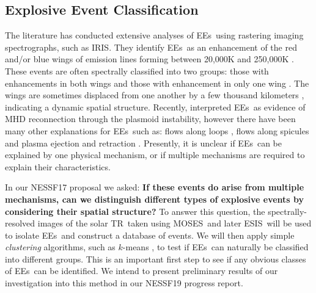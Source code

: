 \documentclass[10pt,letterpaper, doublespace]{article}
\newcommand{\TR}{\ac{TR}}
\newcommand{\EEs}{\acp{EE}}
\newcommand{\MOSES}{\ac{MOSES}}
\newcommand{\ESIS}{\ac{ESIS}}
\newcommand{\IRIS}{\ac{IRIS}}
\begin{document}
		
		\subsection{Explosive Event Classification}
		
			The literature has conducted extensive analyses of \EEs\ using rastering imaging spectrographs, such as \IRIS.
			They identify \EEs\ as an enhancement of the red and/or blue wings of emission lines forming between 20,000K and 250,000K \citep{Moses1994}.
			These events are often spectrally classified into two groups: those with enhancements in both wings and those with enhancement in only one wing \citep{Dere1989}.
			The wings are sometimes displaced from one another by a few thousand kilometers \citep{Dere1994}, indicating a dynamic spatial structure.
			Recently, \cite{Innes2015} interpreted \EEs\ as evidence of  MHD reconnection through the plasmoid instability, however there have been many other explanations for \EEs\ such as: flows along loops \citep{Teriaca2004}, flows along spicules \citep{Wilhelm2000} and plasma ejection and retraction \citep{Huang2014}.
			Presently, it is unclear if \EEs\ can be explained by one physical mechanism, or if multiple mechanisms are required to explain their characteristics.
			
			In our NESSF17 proposal we asked: \textbf{If these events do arise from multiple mechanisms, can we distinguish different types of explosive events by considering their spatial structure?}
			To answer this question, the spectrally-resolved images of the solar \TR\ taken using \MOSES\ and later \ESIS\ will be used to isolate \EEs\ and construct a database of events.
			We will then apply simple \textit{clustering} algorithms, such as $k$-means \citep{Macqueen1967}, to test if \EEs\ can naturally be classified into different groups.
			This is an important first step to see if any obvious classes of \EEs\ can be identified.
			We intend to present preliminary results of our investigation into this method in our NESSF19 progress report.
			
	\begin{landscape}
		
	\end{landscape}

	
	
\end{document}
